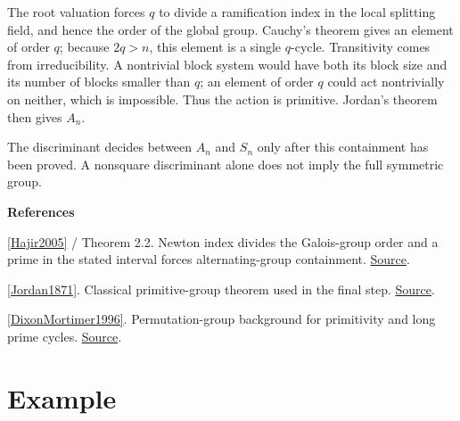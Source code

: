 \documentclass[11pt,a4paper,oneside,openany]{book}
\newenvironment{sources}{\par\smallskip\begingroup\footnotesize\color{atlasgray}\leftskip=10pt\setlength{\parskip}{2pt}}{\par\endgroup\smallskip}
\begin{document}
\color{black} The root valuation forces \(q\) to divide a ramification index in the local splitting field, and hence the order of the global group. Cauchy's theorem gives an element of order \(q\); because \(2q>n\), this element is a single \(q\)-cycle. Transitivity comes from irreducibility. A nontrivial block system would have both its block size and its number of blocks smaller than \(q\); an element of order \(q\) could act nontrivially on neither, which is impossible. Thus the action is primitive. Jordan's theorem then gives \(A_n\).\par

\color{black} The discriminant decides between \(A_n\) and \(S_n\) only after this containment has been proved. A nonsquare discriminant alone does not imply the full symmetric group.\par
\begin{sources}
\textbf{References}\par\smallskip
\noindent\hyperlink{ref:Hajir2005}{[Hajir2005]} / Theorem 2.2. Newton index divides the Galois-group order and a prime in the stated interval forces alternating-group containment. \href{https://jtnb.centre-mersenne.org/item/JTNB_2005__17_2_517_0/}{Source}.\par
\noindent\hyperlink{ref:Jordan1871}{[Jordan1871]}. Classical primitive-group theorem used in the final step. \href{https://www.numdam.org/item/JMPA_1871_2_16__383_0/}{Source}.\par
\noindent\hyperlink{ref:DixonMortimer1996}{[DixonMortimer1996]}. Permutation-group background for primitivity and long prime cycles. \href{https://link.springer.com/book/10.1007/978-1-4612-0731-3}{Source}.\par
\end{sources}\color{black}
\section{Example}
\end{document}
